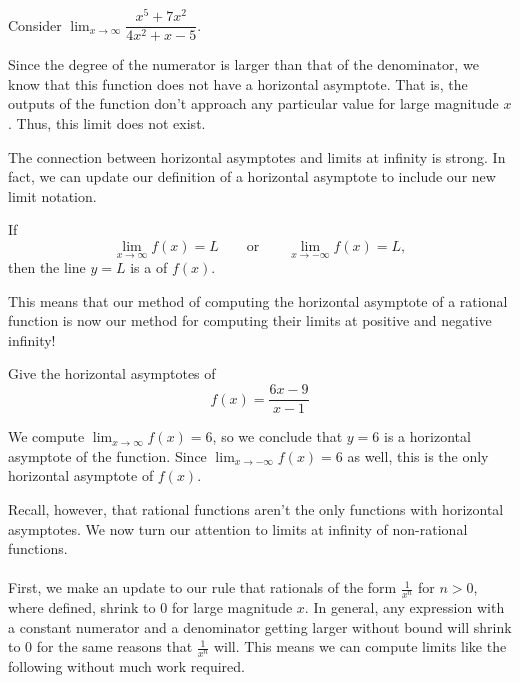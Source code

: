 \documentclass{ximera}
\begin{document}
\begin{example}
	Consider $\displaystyle\lim_{x\rightarrow\infty}\dfrac{x^5+7x^2}{4x^2+x-5}$.
  \begin{explanation} Since the degree of the numerator is larger than that of the denominator, we know that this function does not have a horizontal asymptote. That is, the outputs of the function don't approach any particular value for large magnitude $x$. Thus, this limit does not exist.
  \end{explanation}
\end{example}

The connection between horizontal asymptotes and limits at infinity is strong. In fact, we can update our definition of a horizontal asymptote to include our new limit notation.

\begin{definition}\label{def:horiz asymptote}
If  
\[
\lim_{x\to \infty} f(x) = L \qquad\text{or}\qquad \lim_{x\to -\infty} f(x) = L,
\]
then the line $y=L$ is a  of $f(x)$.
\end{definition}

This means that our method of computing the horizontal asymptote of a rational function is now our method for computing their limits at positive and negative infinity! 

\begin{example} 
Give the horizontal asymptotes of
\[
f(x) = \frac{6x-9}{x-1}
\]
\begin{explanation}
We compute $\lim_{x\to \infty} f(x) = 6$, so we conclude that $y=6$ is a horizontal asymptote of the function. Since $\lim_{x\to -\infty} f(x) =6$ as well, this is the only horizontal asymptote of $f(x)$.
\end{explanation}
\end{example}

Recall, however, that rational functions aren't the only functions with horizontal asymptotes. We now turn our attention to limits at infinity of non-rational functions.
\\
\\First, we make an update to our rule that rationals of the form $\frac{1}{x^n}$ for $n>0$, where defined, shrink to $0$ for large magnitude $x$. In general, any expression with a constant numerator and a denominator getting larger without bound will shrink to $0$ for the same reasons that $\frac{1}{x^n}$ will. This means we can compute limits like the following without much work required.
\end{document}
